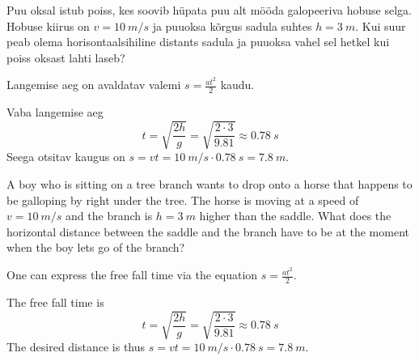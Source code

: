 
Puu oksal istub poiss, kes soovib hüpata puu alt mööda galopeeriva hobuse selga. Hobuse kiirus on $v = \SI{10}{m/s}$ ja puuoksa kõrgus sadula suhtes $h = \SI{3}{m}$. Kui suur peab olema horisontaalsihiline distants sadula ja puuoksa vahel sel hetkel kui poiss oksast lahti laseb?

\hint
Langemise aeg on avaldatav valemi $s = \frac{at^2}{2}$ kaudu.

\solu
Vaba langemise aeg
\[
t=\sqrt{\frac{2 h}{g}}=\sqrt{\frac{2 \cdot 3}{\num{9,81}}} \approx \SI{0,78}{s}
\]
Seega otsitav kaugus on $s = vt = \SI{10}{m/s} \cdot \SI{0,78}{s} = \SI{7,8}{m}$.
\fi


A boy who is sitting on a tree branch wants to drop onto a horse that happens to be galloping by right under the tree. The horse is moving at a speed of $v = \SI{10}{m/s}$ and the branch is $h = \SI{3}{m}$ higher than the saddle. What does the horizontal distance between the saddle and the branch have to be at the moment when the boy lets go of the branch?
\fi


\hinteng
One can express the free fall time via the equation $s = \frac{at^2}{2}$.


\hintsol
The free fall time is 
\[
t=\sqrt{\frac{2 h}{g}}=\sqrt{\frac{2 \cdot 3}{\num{9,81}}} \approx \SI{0,78}{s}
\]
The desired distance is thus $s = vt = \SI{10}{m/s} \cdot \SI{0,78}{s} = \SI{7,8}{m}$.
\probend